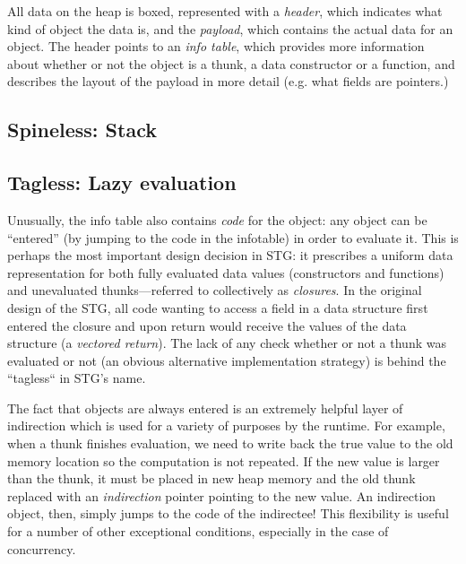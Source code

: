 All data on the heap is boxed, represented with a \emph{header}, which
indicates what kind of object the data is, and the \emph{payload}, which
contains the actual data for an object.  The header points to an
\emph{info table}, which provides more information about whether or not
the object is a thunk, a data constructor or a function, and describes
the layout of the payload in more detail (e.g. what fields are
pointers.) 

\subsection{Spineless: Stack}





\subsection{Tagless: Lazy evaluation}

Unusually, the info table also contains \emph{code} for the object: any
object can be ``entered'' (by jumping to the code in the infotable) in
order to evaluate it.  This is perhaps the most important design
decision in STG: it prescribes a uniform data representation for both
fully evaluated data values (constructors and functions) and unevaluated
thunks---referred to collectively as \emph{closures}.  In the original
design of the STG, all code wanting to access a field in a data
structure first entered the closure and upon return would receive the
values of the data structure (a \emph{vectored return}).  The lack of
any check whether or not a thunk was evaluated or not (an obvious
alternative implementation strategy) is behind the ``tagless`` in STG's
name.



The fact that objects are always entered is an extremely helpful layer
of indirection which is used for a variety of purposes by the runtime.
For example, when a thunk finishes evaluation, we need to write back the
true value to the old memory location so the computation is not
repeated.  If the new value is larger than the thunk, it must be placed
in new heap memory and the old thunk replaced with an \emph{indirection}
pointer pointing to the new value.  An indirection object, then, simply
jumps to the code of the indirectee!  This flexibility is useful for a
number of other exceptional conditions, especially in the case of
concurrency.


